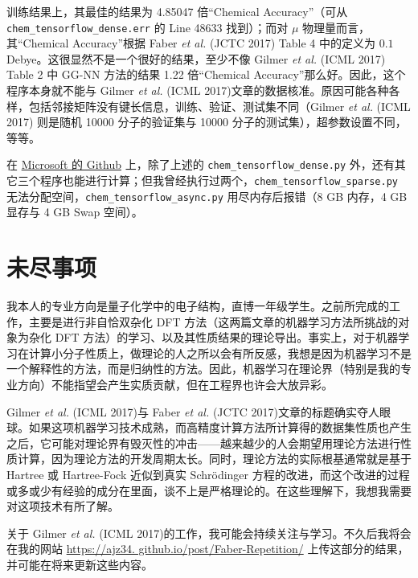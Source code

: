 \documentclass[10pt,a4paper,onecolumn]{article}
\numberwithin{equation}{section}
\begin{document}
训练结果上，其最佳的结果为 4.85047 倍“Chemical Accuracy”（可从 \verb|chem_tensorflow_dense.err| 的 Line 48633 找到）；而对 $ \mu $ 物理量而言，其“Chemical Accuracy”根据 Faber \emph{et al.} (JCTC 2017)\citep{Faber-Lilienfeld.JCTC.2017.13} Table 4 中的定义为 $ 0.1 $ Debye。这很显然不是一个很好的结果，至少不像 Gilmer \emph{et al.} (ICML 2017)\citep{Gilmer-Dahl.ICoML.2017.70} Table 2 中 GG-NN 方法的结果 1.22 倍“Chemical Accuracy”那么好。因此，这个程序本身就不能与 Gilmer \emph{et al.} (ICML 2017)\citep{Gilmer-Dahl.ICoML.2017.70}文章的数据核准。原因可能各种各样，包括邻接矩阵没有键长信息，训练、验证、测试集不同（Gilmer \emph{et al.} (ICML 2017)\citep{Gilmer-Dahl.ICoML.2017.70} 则是随机 10000 分子的验证集与 10000 分子的测试集），超参数设置不同，等等。

在 \href{https://github.com/Microsoft/gated-graph-neural-network-samples}{Microsoft 的 Github} 上，除了上述的 \verb|chem_tensorflow_dense.py| 外，还有其它三个程序也能进行计算；但我曾经执行过两个，\verb|chem_tensorflow_sparse.py| 无法分配空间，\verb|chem_tensorflow_async.py| 用尽内存后报错（8 GB 内存，4 GB 显存与 4 GB Swap 空间）。

\section{未尽事项}

我本人的专业方向是量子化学中的电子结构，直博一年级学生。之前所完成的工作，主要是进行非自恰双杂化 DFT 方法（这两篇文章的机器学习方法所挑战的对象为杂化 DFT 方法）的学习、以及其性质结果的理论导出。事实上，对于机器学习在计算小分子性质上，做理论的人之所以会有所反感，我想是因为机器学习不是一个解释性的方法，而是归纳性的方法。因此，机器学习在理论界（特别是我的专业方向）不能指望会产生实质贡献，但在工程界也许会大放异彩。

Gilmer \emph{et al.} (ICML 2017)\citep{Gilmer-Dahl.ICoML.2017.70}与 Faber \emph{et al.} (JCTC 2017)\citep{Faber-Lilienfeld.JCTC.2017.13}文章的标题确实夺人眼球。如果这项机器学习技术成熟，而高精度计算方法所计算得的数据集性质也产生之后，它可能对理论界有毁灭性的冲击——越来越少的人会期望用理论方法进行性质计算，因为理论方法的开发周期太长。同时，理论方法的实际根基通常就是基于 Hartree 或 Hartree-Fock 近似到真实 Schr\"odinger 方程的改进，而这个改进的过程或多或少有经验的成分在里面，谈不上是严格理论的。在这些理解下，我想我需要对这项技术有所了解。

关于 Gilmer \emph{et al.} (ICML 2017)\citep{Gilmer-Dahl.ICoML.2017.70}的工作，我可能会持续关注与学习。不久后我将会在我的网站 \href{https://ajz34.github.io/post/Faber-Repetition/}{https://ajz34. github.io/post/Faber-Repetition/} 上传这部分的结果，并可能在将来更新这些内容。


\end{document}
